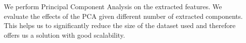 
We perform Principal Component Analysis on the extracted features. We evaluate the effects of the PCA given different number of extracted components. This helps us to significantly reduce the size of the dataset used and therefore offers us a solution with good scalability.

